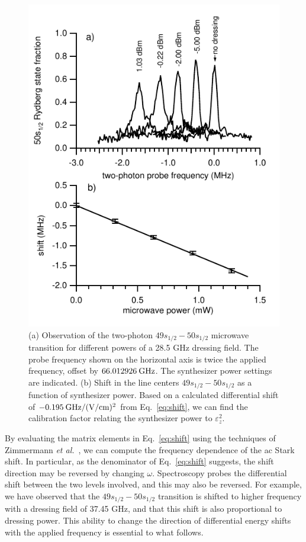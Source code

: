 \documentclass[letterpaper,twocolumn,showpacs,preprintnumbers,amsmath,amssymb,prl,nolongbibliography]{revtex4-2}
\begin{document}
\begin{figure}
\includegraphics{fig1.pdf}
\caption{\label{fg:shiftspectra}
(a) Observation of the two-photon $49s_{1/2}-50s_{1/2}$ microwave
transition for different powers of a 28.5 GHz dressing field.
The probe frequency shown on the horizontal axis is
twice the applied frequency, offset by $66.012926 \: {\rm GHz}$.
The synthesizer power settings are indicated.  (b) Shift
in the line centers $49s_{1/2}-50s_{1/2}$
as a function of synthesizer power.
Based on a calculated differential shift of
$-0.195 \: {\rm GHz/(V/cm)^2}$
from Eq.~\ref{eq:shift},
we can find the calibration factor relating the synthesizer power
to $\varepsilon_z^2$.
}
\end{figure}

By evaluating the matrix elements in Eq.~\ref{eq:shift} using
the techniques of Zimmermann {\it et al.}~\cite{zimmerman:1979},
we can compute the
frequency dependence of the ac Stark shift.  In particular,
as the denominator of Eq.~\ref{eq:shift} suggests, the shift direction
may be reversed by changing $\omega$.
Spectroscopy probes the differential
shift between the two levels involved, and this may also be
reversed.
For example, we have observed that the
$49s_{1/2}-50s_{1/2}$ transition is shifted to higher frequency
with a dressing field of 37.45 GHz, and that this shift is
also proportional to dressing power.
This ability to change the direction of differential
energy shifts with the applied frequency is essential to what
follows.
\end{document}
